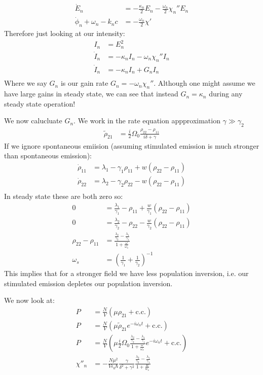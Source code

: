 \begin{align*}
	\dot{E}_n &= -\frac{\kappa_n}{2}E_n - \frac{\omega_n}{2}\chi_n'' E_n \\
	\dot{\phi}_n + \omega_n - k_n c &= -\frac{\omega_n}{2}\chi'
\end{align*}
Therefore just looking at our intensity:
\begin{align*}
	I_n &= E_n^2 \\
	\dot{I}_n &= -\kappa_n I_n -\omega_n\chi_n''I_n \\
	\dot{I}_n &= -\kappa_n I_n +G_n I_n \\
\end{align*}
Where we say $G_n$ is our gain rate $G_n = -\omega_n\chi_n''$. Although one might assume we have large gains in steady state, we can see that instead $G_n = \kappa_n$ during any steady state operation!

We now calucluate $G_n$. We work in the rate equation appproximation $\gamma\gg\gamma_2$
\begin{align*}
	\tilde{\rho}_{21} &= \frac{i}{2}\Omega_0 \frac{\rho_{22} - \rho_{11}}{i\delta + \gamma}
\end{align*}
If we ignore spontaneous emiision (assuming stimulated emission is much stronger than spontaneous emission):
\begin{align*}
	\dot{\rho}_{11} &= \lambda_1 - \gamma_1\rho_{11} + w(\rho_{22} - \rho_{11}) \\
	\dot{\rho}_{22} &= \lambda_2 - \gamma_2\rho_{22} - w(\rho_{22} - \rho_{11}) \\
\end{align*}
In steady state these are both zero so:
\begin{align*}
	0 &= \frac{\lambda_1}{\gamma_1} - \rho_{11} + \frac{w}{\gamma_1}(\rho_{22} - \rho_{11}) \\
	0 &= \frac{\lambda_2}{\gamma_2} - \rho_{22} - \frac{w}{\gamma_2}(\rho_{22} - \rho_{11}) \\
	\rho_{22} - \rho_{11} &= \frac{\frac{\lambda_2}{\gamma_2} - \frac{\lambda_1}{\gamma_1}}{1 + \frac{\omega}{\omega_s}} \\
	\omega_s &= \left(\frac{1}{\gamma_1} + \frac{1}{\gamma_2}\right)^{-1}
\end{align*}
This implies that for a stronger field we have less population inversion, i.e. our stimulated emission depletes our population inversion.

We now look at:
\begin{align*}
	P &= \frac{N}{V}(\mu\rho_{21} + \text{c.c.}) \\
	P &= \frac{N}{V}(\mu\tilde{\rho}_{21}e^{-i\omega_n t} + \text{c.c.}) \\
	P &= \frac{N}{V}(\mu \frac{i}{2}\Omega_0\frac{\frac{\lambda_2}{\gamma_2} - \frac{\lambda_1}{\gamma_1}}{1 + \frac{\omega}{\omega_s}} e^{-i\omega_n t} + \text{c.c.}) \\
	\chi''_n &= -\frac{N\mu^2}{V\epsilon_0\hbar} \frac{\gamma}{\delta^2+\gamma^2} \frac{\frac{\lambda_2}{\gamma_2} - \frac{\lambda_1}{\gamma_1}}{1 + \frac{w}{w_s}}
\end{align*}
